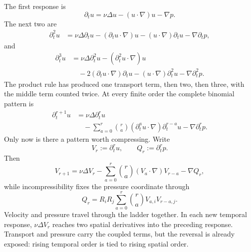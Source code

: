 \documentclass[12pt]{article}
\begin{document}
The first response is
\[
  \partial_tu
  =
  \nu\Delta u
  -(u\cdot\nabla)u
  -\nabla p.
\]
The next two are
\[
\begin{aligned}
  \partial_t^2u
  &=
  \nu\Delta\partial_tu
  -(\partial_tu\cdot\nabla)u
  -(u\cdot\nabla)\partial_tu
  -\nabla\partial_tp,
\end{aligned}
\]
and
\[
\begin{aligned}
  \partial_t^3u
  &=
  \nu\Delta\partial_t^2u
  -(\partial_t^2u\cdot\nabla)u\\
  &\quad
  -2(\partial_tu\cdot\nabla)\partial_tu
  -(u\cdot\nabla)\partial_t^2u
  -\nabla\partial_t^2p.
\end{aligned}
\]
The product rule has produced one transport term, then two, then three, with
the middle term counted twice. At every finite order the complete binomial
pattern is
\[
\begin{aligned}
  \partial_t^{r+1}u
  &=
  \nu\Delta\partial_t^ru\\
  &\quad
  -\sum_{a=0}^{r}\binom ra
  (\partial_t^au\cdot\nabla)\partial_t^{r-a}u
  -\nabla\partial_t^rp.
\end{aligned}
\]
Only now is there a pattern worth compressing. Write
\[
  V_r:=\partial_t^ru,
  \qquad
  Q_r:=\partial_t^rp.
\]
Then
\[
  V_{r+1}
  =
  \nu\Delta V_r
  -\sum_{a=0}^{r}\binom ra
  (V_a\cdot\nabla)V_{r-a}
  -\nabla Q_r,
\]
while incompressibility fixes the pressure coordinate through
\[
  Q_r
  =
  R_iR_j\sum_{a=0}^{r}\binom ra V_{a,i}V_{r-a,j}.
\]
Velocity and pressure travel through the ladder together. In each new temporal
response, \(\nu\Delta V_r\) reaches two spatial derivatives into the preceding
response. Transport and pressure carry the coupled terms, but the reversal is
already exposed: rising temporal order is tied to rising spatial order.
\end{document}
